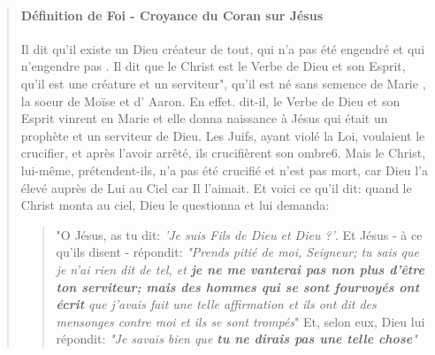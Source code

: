 \begin{quote}
\paragraph{Définition de Foi - Croyance du Coran sur Jésus}
Il dit qu'il existe un Dieu créateur de tout, qui n'a pas été engendré et qui n'engendre pas . Il dit que le Christ est le Verbe de Dieu et son Esprit, qu'il est une créature et un serviteur", qu'il est né sans semence de Marie , la soeur de Moïse et d' Aaron. En effet. dit-il, le Verbe de Dieu et son Esprit vinrent en Marie et elle donna naissance à Jésus qui était un prophète et un serviteur de Dieu. Les Juifs, ayant violé la Loi, voulaient le crucifier, et après l'avoir arrêté, ils crucifièrent son ombre6. Mais le Christ, lui-même, prétendent-ils, n'a pas été crucifié et n'est pas mort, car Dieu l'a élevé auprès de Lui au Ciel car Il l'aimait. Et voici ce qu'il dit: quand le Christ monta au ciel, Dieu le questionna et lui demanda: 
\begin{quote}
    "O Jésus, as tu dit: \textit{'Je suis Fils de Dieu et Dieu ?'}. Et Jésus - à ce qu'ils disent - répondit: \textit{"Prends pitié de moi, Seigneur; tu sais que je n'ai rien dit de tel, et \textbf{je ne me vanterai pas non plus d'être ton serviteur; mais des hommes qui se sont fourvoyés ont écrit }que j'avais fait une telle affirmation et ils ont dit des mensonges contre moi et ils se sont trompés}" Et, selon eux, Dieu lui répondit: \textit{"Je savais bien que \textbf{tu ne dirais pas une telle chose}" }
\end{quote}   

\end{quote}
